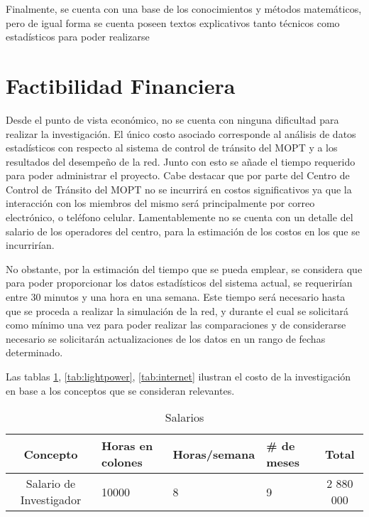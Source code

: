 	Finalmente, se cuenta con una base de los conocimientos y m\'{e}todos
matem\'{a}ticos, pero de igual forma se cuenta poseen textos explicativos
tanto t\'{e}cnicos como estad\'{i}sticos para poder realizarse
		
	
	\section{Factibilidad Financiera}
	
	Desde el punto de vista econ\'{o}mico, no se cuenta con ninguna dificultad
para realizar la investigaci\'{o}n. El \'{u}nico costo asociado corresponde al
an\'{a}lisis de datos estad\'{i}sticos con respecto al sistema de control de
tr\'{a}nsito del MOPT y a los resultados del desempe\~{n}o de la red. Junto con
esto se a\~{n}ade el tiempo requerido para poder administrar el proyecto. Cabe
destacar que por parte del Centro de Control de Tr\'{a}nsito del MOPT no se
incurrir\'{a} en costos significativos ya que la interacci\'{o}n con los
miembros del mismo ser\'{a} principalmente por correo electr\'{o}nico, o
tel\'{e}fono celular. Lamentablemente no se cuenta con un detalle del salario
de los operadores del centro, para la estimaci\'{o}n de los costos en los
que se incurrir\'{i}an.
	
		No obstante, por la estimaci\'{o}n del tiempo que se pueda emplear, se
considera que para poder proporcionar los datos estad\'{i}sticos del sistema
actual, se requerir\'{i}an entre 30 minutos y una hora en una semana. Este
tiempo ser\'{a} necesario hasta que se proceda a realizar la simulaci\'{o}n de
la red, y durante el cual se solicitar\'{a} como m\'{i}nimo una vez para poder
realizar las comparaciones y de considerarse necesario se solicitar\'{a}n
actualizaciones de los datos en un rango de fechas determinado.
	
		Las tablas \ref{tab:salary}, \ref{tab:lightpower}, \ref{tab:internet} ilustran
		el costo de la investigaci\'{o}n en base a los conceptos que se consideran relevantes.
		
	\begin{table}[!h]
			\centering
			\begin{tabular}{|c|p{3cm}|p{3cm}|p{2cm}|c|}
				\hline
				\textbf{Concepto} & \textbf{Horas en colones} & \textbf{Horas/semana} &
				\textbf{\# de meses} & \textbf{Total}\\ \hline 
				Salario de Investigador & 10000 & 8 & 9 & 2 880 000 \\ 
				\hline
			\end{tabular}
			\caption{Salarios}
			\label{tab:salary}
		\end{table}
		
